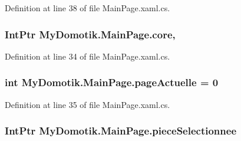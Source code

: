 Definition at line 38 of file Main\+Page.\+xaml.\+cs.

\subsubsection[{\texorpdfstring{core}{core}}]{\setlength{\rightskip}{0pt plus 5cm}Int\+Ptr My\+Domotik.\+Main\+Page.\+core\hspace{0.3cm}{\ttfamily [static]}, {\ttfamily [private]}}\hypertarget{class_my_domotik_1_1_main_page_a8f9c79ea42dfcba7339767330afec556}{}\label{class_my_domotik_1_1_main_page_a8f9c79ea42dfcba7339767330afec556}


Definition at line 34 of file Main\+Page.\+xaml.\+cs.

\subsubsection[{\texorpdfstring{page\+Actuelle}{pageActuelle}}]{\setlength{\rightskip}{0pt plus 5cm}int My\+Domotik.\+Main\+Page.\+page\+Actuelle = 0\hspace{0.3cm}{\ttfamily [private]}}\hypertarget{class_my_domotik_1_1_main_page_a09f4e2e480f274465f901d18aa73e9fb}{}\label{class_my_domotik_1_1_main_page_a09f4e2e480f274465f901d18aa73e9fb}


Definition at line 35 of file Main\+Page.\+xaml.\+cs.

\subsubsection[{\texorpdfstring{piece\+Selectionnee}{pieceSelectionnee}}]{\setlength{\rightskip}{0pt plus 5cm}Int\+Ptr My\+Domotik.\+Main\+Page.\+piece\+Selectionnee\hspace{0.3cm}{\ttfamily [private]}}\hypertarget{class_my_domotik_1_1_main_page_a06add3e52fde0986ff8c8cb88cfd06c4}{}\label{class_my_domotik_1_1_main_page_a06add3e52fde0986ff8c8cb88cfd06c4}



